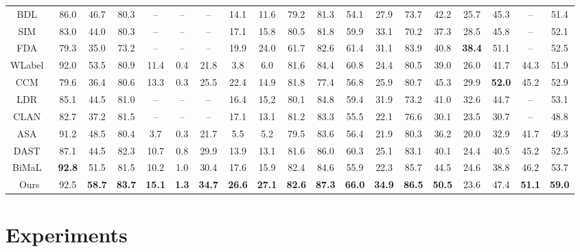 \documentclass{article}
\begin{document}
\begin{table*}[t]
{\begin{tabular}{c|cccccccccccccccc|c|c}
\midrule
BDL~\cite{BDL} &86.0 &46.7 &80.3 &-- &-- &-- &14.1 &11.6 &79.2 &81.3 &54.1 &27.9 &73.7 &42.2 &25.7 &45.3  &-- &51.4 \\
SIM~\cite{SIM}& 83.0 &44.0 &80.3 &-- &-- &-- & 17.1 &15.8 &80.5 &81.8 &59.9 &33.1 &70.2 &37.3 &28.5 &45.8  & -- &52.1 \\
FDA~\cite{FDA}& 79.3 &35.0 &73.2 &-- &-- &-- &19.9 &24.0 &61.7 &82.6 &61.4 &31.1 &83.9 &40.8 &\textbf{38.4} &51.1  & -- &52.5\\
WLabel~\cite{WLabel}&92.0 &53.5 &80.9 &11.4 &0.4 &21.8 &3.8 &6.0 &81.6 &84.4 &60.8 &24.4 &80.5 &39.0 &26.0 &41.7  &44.3 &51.9 \\
CCM~\cite{CCM}&79.6 &36.4 &80.6 &13.3 &0.3 &25.5 &22.4 &14.9 &81.8 &77.4 &56.8 &25.9 &80.7 &45.3 &29.9 &\textbf{52.0}  & 45.2 &52.9 \\
LDR~\cite{LDR}&85.1 &44.5 &81.0 &-- &-- &-- &16.4 &15.2 &80.1 &84.8 &59.4 &31.9 &73.2 &41.0 &32.6 &44.7 & -- &53.1 \\
CLAN~\cite{CLANv2} &82.7 &37.2 &81.5 &-- &-- &-- &17.1 &13.1 &81.2 &83.3 &55.5 &22.1 &76.6 &30.1 &23.5 &30.7 & -- &48.8\\
ASA~\cite{ASA} &91.2 &48.5 &80.4 &3.7 &0.3 &21.7 &5.5 &5.2 &79.5 &83.6 &56.4 &21.9 &80.3 &36.2 &20.0 &32.9 & 41.7 &49.3\\
DAST~\cite{DAST}&87.1 &44.5 &82.3 &10.7 &0.8 &29.9 &13.9 &13.1 &81.6 &86.0 &60.3 &25.1 &83.1 &40.1 &24.4 &40.5 & 45.2 &52.5\\
BiMaL~\cite{truong2021bimal} & \textbf{92.8} & 51.5 & 81.5 &10.2 &1.0 &30.4  & 17.6 & 15.9 & 82.4 & 84.6 & 55.9 & 22.3 & 85.7 & 44.5 & 24.6 & 38.8 & 46.2 &53.7 \\
\midrule
Ours &92.5 &\textbf{58.7} &\textbf{83.7} &\textbf{15.1} &\textbf{1.3} &\textbf{34.7}  &\textbf{26.6} &\textbf{27.1} &\textbf{82.6} &\textbf{87.3} &\textbf{66.0
} &\textbf{34.9} &\textbf{86.5} &\textbf{50.5} &23.6 &47.4  & \textbf{51.1} &\textbf{59.0}\\
\bottomrule
\end{tabular}}
\end{table*}



\section{Experiments}
\end{document}
